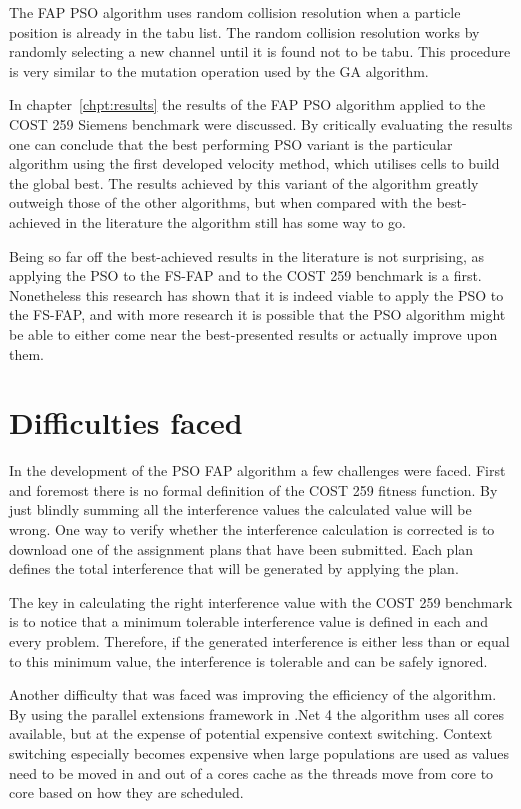 The FAP PSO algorithm uses random collision resolution when a particle position is already in the tabu list. The random collision resolution works by randomly selecting a new channel until it is found not to be tabu. This procedure is very similar to the mutation operation used by the GA algorithm.

In chapter~\ref{chpt:results} the results of the FAP PSO algorithm applied to the COST 259 Siemens benchmark were discussed. By critically evaluating the results one can conclude that the best performing PSO variant is the particular algorithm using the first developed velocity method, which utilises cells to build the global best. The results achieved by this variant of the algorithm greatly outweigh those of the other algorithms, but when compared with the best-achieved in the literature the algorithm still has some way to go.

Being so far off the best-achieved results in the literature is not surprising, as applying the PSO to the FS-FAP and to the COST 259 benchmark is a first. Nonetheless this research has shown that it is indeed viable to apply the PSO to the FS-FAP, and with more research it is possible that the PSO algorithm might be able to either come near the best-presented results or actually improve upon them.

\section{Difficulties faced}
In the development of the PSO FAP algorithm a few challenges were faced. First and foremost there is no formal definition of the COST 259 fitness function. By just blindly summing all the interference values the calculated value will be wrong. One way to verify whether the interference calculation is corrected is to download one of the assignment plans that have been submitted. Each plan defines the total interference that will be generated by applying the plan. 

The key in calculating the right interference value with the COST 259 benchmark is to notice that a minimum tolerable interference value is defined in each and every problem. Therefore, if the generated interference is either less than or equal to this minimum value, the interference is tolerable and can be safely ignored.

Another difficulty that was faced was improving the efficiency of the algorithm. By using the parallel extensions framework in .Net 4 the algorithm uses all cores available, but at the expense of potential expensive context switching. Context switching especially becomes expensive when large populations are used as values need to be moved in and out of a cores cache as the threads move from core to core based on how they are scheduled.

